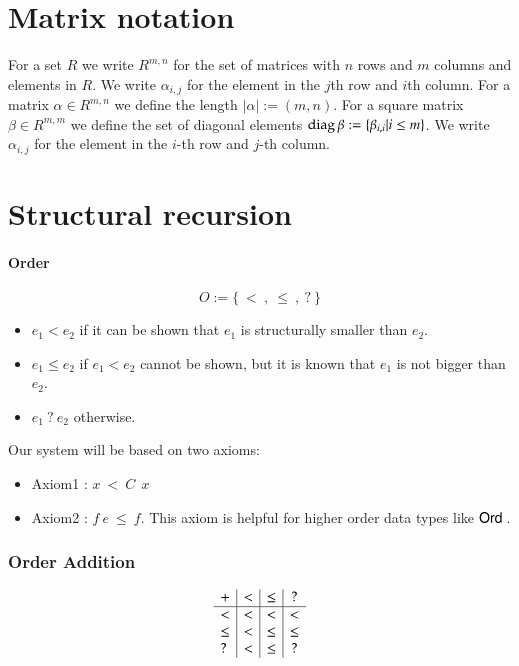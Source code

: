\section{Matrix notation}

\newcommand{\diag}{\opn{diag}}

For a set $R$ we write $R^{m,n}$ for the set of matrices with $n$ rows and $m$ columns and elements in $R$.
We write $\alpha_{i,j}$ for the element in the $j$th row and $i$th column.
For a matrix $\alpha \in R^{m,n}$ we define the length $|\alpha| := (m,n)$.
For a square matrix $\beta \in R^{m,m}$ we define the set of diagonal elements $\diag \beta := \{ \beta_{i,i} \vert i \leq m\}$.
We write $\alpha_{i,j}$ for the element in the $i$-th row and $j$-th column.


\newcommand{\order}{\opn{ORDER}}
\section{Structural recursion}

\paragraph*{Order}
\[ O := \{ \: < \: , \: \leq \: , \: ? \: \} \]

\begin{itemize}
\item
$e_1 < e_2$ if it can be shown that $e_1$ is structurally smaller than $e_2$.
\item
$e_1 \leq e_2$  if $e_1 < e_2$ cannot be shown, but it is known that $e_1$ is not bigger than $e_2$.
\item
$e_1 \: ? \: e_2 $ otherwise.
\end{itemize}

\noindent Our system will be based on two axioms:
\begin{itemize}
\item
Axiom1 : $ x \: < \: C \: \: x \: $
\item
Axiom2 : $f \: e \: \leq \: f $.
This axiom is helpful for higher order data types like $\mathsf{Ord}\:$.
\end{itemize}


\subsubsection{Order Addition}
\[
\begin{array}{l | c |c | c }

 +    &  <   &  \leq   &  ? \\
 \hline 
 <    &  <   & <       &  <   \\
 \leq &  <   & \leq    &  \leq \\
 ?    &  <   & \leq    &  ?
\end{array}
\]

